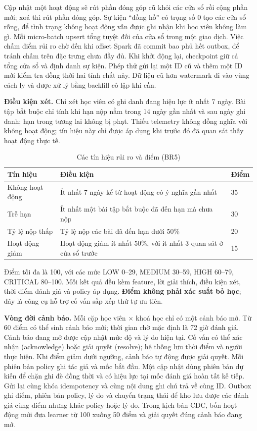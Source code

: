 Cập nhật một hoạt động sẽ rút phần đóng góp cũ khỏi các cửa sổ rồi cộng phần mới; xoá thì rút phần đóng góp. Sự kiện ``đồng hồ'' có trọng số 0 tạo các cửa sổ rỗng, để tình trạng không hoạt động vẫn được ghi nhận khi học viên không làm gì. Mỗi micro-batch upsert tổng tuyệt đối của cửa sổ trong một giao dịch. Việc chấm điểm rủi ro chờ đến khi offset Spark đã commit bao phủ hết outbox, để tránh chấm trên đặc trưng chưa đầy đủ. Khi khởi động lại, checkpoint giữ cả tổng cửa sổ và định danh sự kiện. Phép thử gửi lại một ID cũ và thêm một ID mới kiểm tra đồng thời hai tính chất này. Dữ liệu cũ hơn watermark đi vào vùng cách ly và được xử lý bằng backfill cô lập khi cần.

\textbf{Điều kiện xét.} Chỉ xét học viên có ghi danh đang hiệu lực ít nhất 7 ngày. Bài tập bắt buộc chỉ tính khi hạn nộp nằm trong 14 ngày gần nhất và sau ngày ghi danh; hạn trong tương lai không bị phạt. Thiếu telemetry không đồng nghĩa với không hoạt động; tín hiệu này chỉ được áp dụng khi trước đó đã quan sát thấy hoạt động thực tế.

\begin{table}[H]
\centering\small
\caption{Các tín hiệu rủi ro và điểm (BR5)}\label{tab:br5-signals}
\begin{tabularx}{\textwidth}{@{}L{3.2cm}YL{1.3cm}@{}}
\toprule
\textbf{Tín hiệu} & \textbf{Điều kiện} & \textbf{Điểm} \\
\midrule
Không hoạt động & Ít nhất 7 ngày kể từ hoạt động có ý nghĩa gần nhất & 35 \\
Trễ hạn & Ít nhất một bài tập bắt buộc đã đến hạn mà chưa nộp & 30 \\
Tỷ lệ nộp thấp & Tỷ lệ nộp các bài đã đến hạn dưới 50\% & 20 \\
Hoạt động giảm & Hoạt động giảm ít nhất 50\%, với ít nhất 3 quan sát ở cửa sổ trước & 15 \\
\bottomrule
\end{tabularx}
\end{table}

Điểm tối đa là 100, với các mức LOW 0--29, MEDIUM 30--59, HIGH 60--79, CRITICAL 80--100. Mỗi kết quả đều kèm feature, lời giải thích, điều kiện xét, thời điểm đánh giá và policy áp dụng. \textbf{Điểm không phải xác suất bỏ học}; đây là công cụ hỗ trợ cố vấn sắp xếp thứ tự ưu tiên.

\textbf{Vòng đời cảnh báo.} Mỗi cặp học viên × khoá học chỉ có một cảnh báo mở. Từ 60 điểm có thể sinh cảnh báo mới; thời gian chờ mặc định là 72 giờ đánh giá. Cảnh báo đang mở được cập nhật mức độ và lý do hiện tại. Cố vấn có thể xác nhận (acknowledge) hoặc giải quyết (resolve); hệ thống lưu thời điểm và người thực hiện. Khi điểm giảm dưới ngưỡng, cảnh báo tự động được giải quyết. Mỗi phiên bản policy ghi tác giả và mốc bắt đầu. Một cập nhật dùng phiên bản dự kiến để chặn ghi đè đồng thời và có hiệu lực tại mốc đánh giá hoàn tất kế tiếp. Gửi lại cùng khóa idempotency và cùng nội dung ghi chú trả về cùng ID. Outbox ghi điểm, phiên bản policy, lý do và chuyển trạng thái để kho lưu được các đánh giá cùng điểm nhưng khác policy hoặc lý do. Trong kịch bản CDC, bốn hoạt động mới đưa learner từ 100 xuống 50 điểm và giải quyết đúng cảnh báo đang mở.


